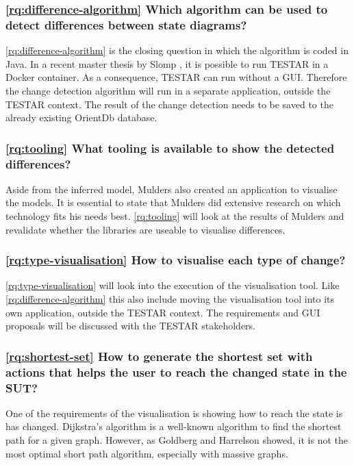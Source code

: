 \subsubsection{\ref{rq:difference-algorithm} Which algorithm can be used to detect differences between state diagrams?}
\ref{rq:difference-algorithm} is the closing question in which the algorithm is coded in Java. In a recent master thesis by Slomp \cite{insert-slomp-hereTODO}, it is possible to run TESTAR in a Docker container. As a consequence, TESTAR can run without a GUI. Therefore the change detection algorithm will run in a separate application, outside the TESTAR context. The result of the change detection needs to be saved to the already existing OrientDb database. 

\subsubsection{\ref{rq:tooling} What tooling is available to show the detected differences?}
Aside from the inferred model, Mulders also created an application to visualise the models. It is essential to state that Mulders did extensive research on which technology fits his needs best. \ref{rq:tooling} will look at the results of Mulders and revalidate whether the libraries are useable to visualise differences. 

\subsubsection{\ref{rq:type-visualisation} How to visualise each type of change?}
\ref{rq:type-visualisation} will look into the execution of the visualisation tool. Like \ref{rq:difference-algorithm} this also include moving the visualisation tool into its own application, outside the TESTAR context. The requirements and GUI proposals will be discussed with the TESTAR stakeholders. 

\subsubsection{\ref{rq:shortest-set} How to generate the shortest set with actions that helps the user to reach the changed state in the SUT?}
One of the requirements of the visualisation is showing how to reach the state is has changed. Dijkstra's algorithm \cite{dijkstra1959note} is a well-known algorithm to find the shortest path for a given graph. However, as Goldberg and Harrelson \cite{goldberg2005computing} showed, it is not the most optimal short path algorithm, especially with massive graphs. 


